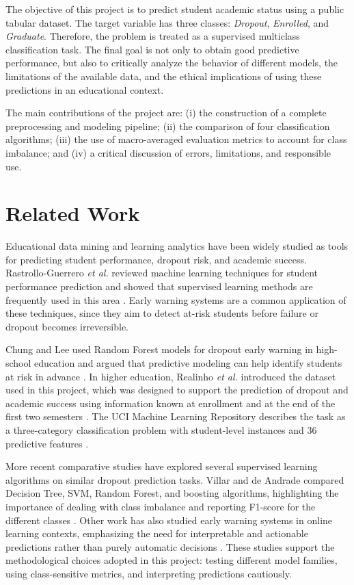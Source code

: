 \documentclass[lettersize,journal]{IEEEtran}
\begin{document}
The objective of this project is to predict student academic status using a public tabular dataset. The target variable has three classes: \emph{Dropout}, \emph{Enrolled}, and \emph{Graduate}. Therefore, the problem is treated as a supervised multiclass classification task. The final goal is not only to obtain good predictive performance, but also to critically analyze the behavior of different models, the limitations of the available data, and the ethical implications of using these predictions in an educational context.

The main contributions of the project are: (i) the construction of a complete preprocessing and modeling pipeline; (ii) the comparison of four classification algorithms; (iii) the use of macro-averaged evaluation metrics to account for class imbalance; and (iv) a critical discussion of errors, limitations, and responsible use.

\section{Related Work}
Educational data mining and learning analytics have been widely studied as tools for predicting student performance, dropout risk, and academic success. Rastrollo-Guerrero \emph{et al.} reviewed machine learning techniques for student performance prediction and showed that supervised learning methods are frequently used in this area \cite{rastrollo2020review}. Early warning systems are a common application of these techniques, since they aim to detect at-risk students before failure or dropout becomes irreversible.

Chung and Lee used Random Forest models for dropout early warning in high-school education and argued that predictive modeling can help identify students at risk in advance \cite{chung2019dropout}. In higher education, Realinho \emph{et al.} introduced the dataset used in this project, which was designed to support the prediction of dropout and academic success using information known at enrollment and at the end of the first two semesters \cite{realinho2022dataset}. The UCI Machine Learning Repository describes the task as a three-category classification problem with student-level instances and 36 predictive features \cite{uci2021dropout}.

More recent comparative studies have explored several supervised learning algorithms on similar dropout prediction tasks. Villar and de Andrade compared Decision Tree, SVM, Random Forest, and boosting algorithms, highlighting the importance of dealing with class imbalance and reporting F1-score for the different classes \cite{villar2024supervised}. Other work has also studied early warning systems in online learning contexts, emphasizing the need for interpretable and actionable predictions rather than purely automatic decisions \cite{baneres2023early}. These studies support the methodological choices adopted in this project: testing different model families, using class-sensitive metrics, and interpreting predictions cautiously.
\end{document}
